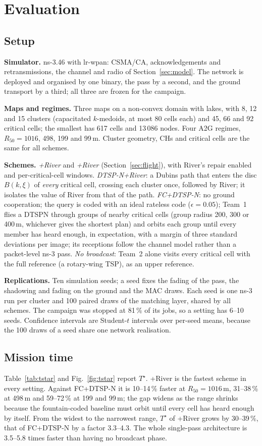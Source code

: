 \section{Evaluation}\label{sec:eval}
\subsection{Setup}
\textbf{Simulator.} ns-3.46 with lr-wpan: CSMA/CA, acknowledgements and retransmissions, the channel and radio of
Section~\ref{sec:model}. The network is deployed and organised by one binary, the pass by a second, and the ground
transport by a third; all three are frozen for the campaign.

\textbf{Maps and regimes.} Three maps on a non-convex domain with lakes, with 8, 12 and 15 clusters (capacitated
$k$-medoids, at most 80 cells each) and 45, 66 and 92 critical cells; the smallest has 617 cells and 13\,086 nodes. Four
A2G regimes, $R_{50}=1016$, 498, 199 and 99\,m. Cluster geometry, CHs and critical cells are the same for all schemes.

\textbf{Schemes.} \emph{\lmtour{}+River} and \emph{\chord{}+River} (Section~\ref{sec:flight}), with River's repair
enabled and per-critical-cell windows. \emph{DTSP-N+River}: a Dubins path that enters the disc $B(k,\xi)$ of
\emph{every} critical cell, crossing each cluster once, followed by River; it isolates the value of River from that of
the path. \emph{FC+DTSP-N}: no ground cooperation; the query is coded with an ideal rateless code ($\epsilon=0.05$); Team~1
flies a DTSPN through groups of nearby critical cells (group radius 200, 300 or 400\,m, whichever gives the shortest
plan) and orbits each group until every member has heard enough, in expectation, with a margin of three standard
deviations per image; its receptions follow the channel model rather than a packet-level ns-3 pass. \emph{No broadcast}:
Team~2 alone visits every critical cell with the full reference (a rotary-wing TSP), as an upper reference.

\textbf{Replications.} Ten simulation seeds; a seed fixes the fading of the pass, the shadowing and fading on the ground
and the MAC draws. Each seed is one ns-3 run per cluster and 100 paired draws of the matching layer, shared by all
schemes. The campaign was stopped at 81\,\% of its jobs, so a setting has 6--10 seeds. Confidence intervals are Student-$t$
intervals over per-seed means, because the 100 draws of a seed share one network realisation.

\subsection{Mission time}
Table~\ref{tab:tstar} and Fig.~\ref{fig:tstar} report $T^\star$. \lmtour{}+River is the fastest scheme in every setting.
Against FC+DTSP-N it is 10--14\,\% faster at $R_{50}=1016$\,m, 31--38\,\% at 498\,m and 59--72\,\% at 199 and 99\,m; the
gap widens as the range shrinks because the fountain-coded baseline must orbit until every cell has heard enough by
itself. From the widest to the narrowest range, $T^\star$ of \lmtour{}+River grows by 30--39\,\%, that of FC+DTSP-N by a
factor 3.3--4.3. The whole single-pass architecture is 3.5--5.8 times faster than having no broadcast phase.

